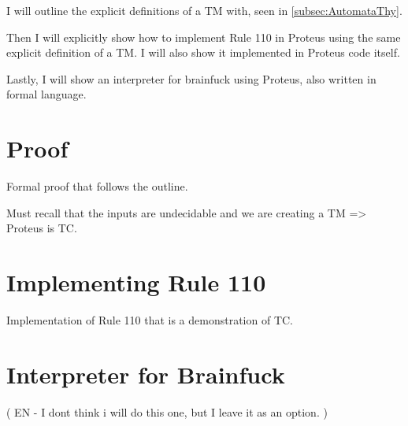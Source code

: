 I will outline the explicit definitions of a TM with, seen in \ref{subsec:AutomataThy}.

Then I will explicitly show how to implement Rule 110 in Proteus using the same explicit definition of a TM.
I will also show it implemented in Proteus code itself.

Lastly, I will show an interpreter for brainfuck using Proteus, also written in formal language.

\section{Proof}

Formal proof that follows the outline.

Must recall that the inputs are undecidable and we are creating a TM => Proteus is TC.

\section{Implementing Rule 110}

Implementation of Rule 110 that is a demonstration of TC.

\section{Interpreter for Brainfuck}

(
EN - I dont think i will do this one, but I leave it as an option.
)